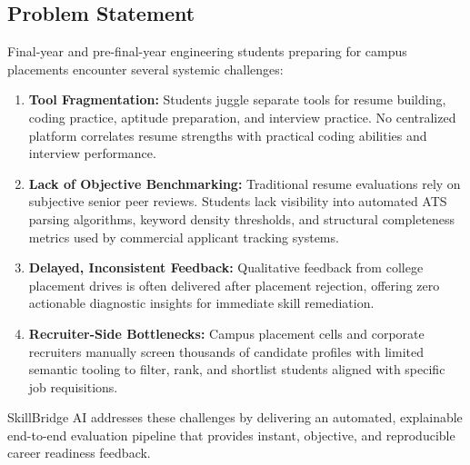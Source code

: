 \documentclass[12pt,a4paper,oneside]{report}
\begin{document}
\subsection{Problem Statement}
Final-year and pre-final-year engineering students preparing for campus placements encounter several systemic challenges:
\begin{enumerate}[leftmargin=0.8cm]
    \item \textbf{Tool Fragmentation:} Students juggle separate tools for resume building, coding practice, aptitude preparation, and interview practice. No centralized platform correlates resume strengths with practical coding abilities and interview performance.
    \item \textbf{Lack of Objective Benchmarking:} Traditional resume evaluations rely on subjective senior peer reviews. Students lack visibility into automated ATS parsing algorithms, keyword density thresholds, and structural completeness metrics used by commercial applicant tracking systems.
    \item \textbf{Delayed, Inconsistent Feedback:} Qualitative feedback from college placement drives is often delivered after placement rejection, offering zero actionable diagnostic insights for immediate skill remediation.
    \item \textbf{Recruiter-Side Bottlenecks:} Campus placement cells and corporate recruiters manually screen thousands of candidate profiles with limited semantic tooling to filter, rank, and shortlist students aligned with specific job requisitions.
\end{enumerate}

SkillBridge AI addresses these challenges by delivering an automated, explainable end-to-end evaluation pipeline that provides instant, objective, and reproducible career readiness feedback.
\end{document}
